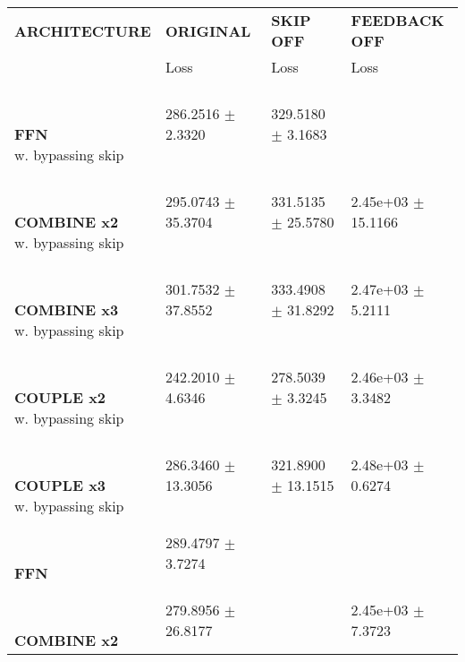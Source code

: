 
\begin{table}[ht]
    \centering
    \begin{tabular}{|>{\columncolor{gray!05}}l|l|l|l|}
        \hline
        \rowcolor{white}
        \textbf{\footnotesize ARCHITECTURE} & \textbf{\footnotesize ORIGINAL} & \textbf{\footnotesize SKIP OFF} & \textbf{\footnotesize FEEDBACK OFF} \\

        \rowcolor{white}
        & {\footnotesize Loss} & {\footnotesize Loss} & {\footnotesize Loss} \\
        \hline
\shortstack[l]{\\ {} \\ \textbf{FFN}\\{w. bypassing skip}} & 286.2516 $\pm$ 2.3320 & 329.5180 $\pm$ 3.1683 &  \\
 \hline 
\shortstack[l]{\\ {} \\ \textbf{COMBINE x2}\\{w. bypassing skip}} & 295.0743 $\pm$ 35.3704 & 331.5135 $\pm$ 25.5780 & 2.45e+03 $\pm$ 15.1166 \\
 \hline 
\shortstack[l]{\\ {} \\ \textbf{COMBINE x3}\\{w. bypassing skip}} & 301.7532 $\pm$ 37.8552 & 333.4908 $\pm$ 31.8292 & 2.47e+03 $\pm$ 5.2111 \\
 \hline 
\shortstack[l]{\\ {} \\ \textbf{COUPLE x2}\\{w. bypassing skip}} & 242.2010 $\pm$ 4.6346 & 278.5039 $\pm$ 3.3245 & 2.46e+03 $\pm$ 3.3482 \\
 \hline 
\shortstack[l]{\\ {} \\ \textbf{COUPLE x3}\\{w. bypassing skip}} & 286.3460 $\pm$ 13.3056 & 321.8900 $\pm$ 13.1515 & 2.48e+03 $\pm$ 0.6274 \\
 \hline 
\shortstack[l]{\\ {} \\ \textbf{FFN}\\{}} & 289.4797 $\pm$ 3.7274 &  &  \\
 \hline 
\shortstack[l]{\\ {} \\ \textbf{COMBINE x2}\\{}} & 279.8956 $\pm$ 26.8177 &  & 2.45e+03 $\pm$ 7.3723 \\

\end{tabular}
\end{table}
